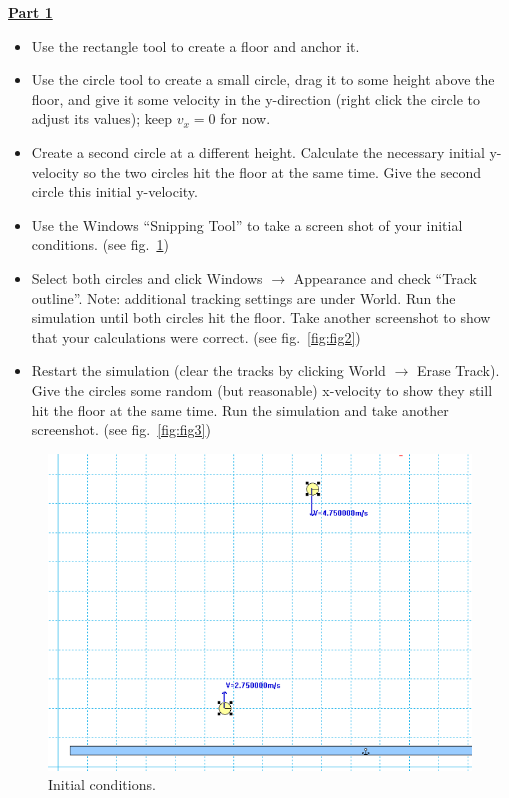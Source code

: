 \documentclass[12pt]{article}
\begin{document}
\underline{\textbf{Part 1}} \par
\begin{itemize}
\item Use the rectangle tool to create a floor and anchor it.
\item Use the circle tool to create a small circle, drag it to some height above the floor, and give it some velocity in the y-direction (right click the circle to adjust its values); keep $v_x = 0$ for now.
\item Create a second circle at a different height.
Calculate the necessary initial y-velocity so the two circles hit the floor at the same time.
Give the second circle this initial y-velocity.
\item Use the Windows ``Snipping Tool'' to take a screen shot of your initial conditions. (see fig.~\ref{fig:fig1})
\item Select both circles and click Windows $\rightarrow$ Appearance and check ``Track outline''.
Note: additional tracking settings are under World.
Run the simulation until both circles hit the floor.
Take another screenshot to show that your calculations were correct. (see fig.~\ref{fig:fig2})
\item Restart the simulation (clear the tracks by clicking World $\rightarrow$ Erase Track).
Give the circles some random (but reasonable) x-velocity to show they still hit the floor at the same time.
Run the simulation and take another screenshot. (see fig.~\ref{fig:fig3})
\end{itemize}
%
\begin{figure}[!h]
\centering
\includegraphics[scale=0.35]{figures/fig1.png}
\caption{Initial conditions.}
\label{fig:fig1}
\end{figure}
\end{document}
